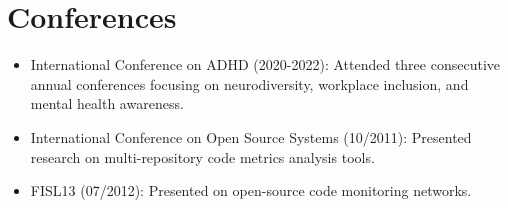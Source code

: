 \section{Conferences}
\begin{itemize}
    \item \footnotesize{International Conference on ADHD (2020-2022):}\scriptsize{ Attended three 
        consecutive annual conferences focusing on neurodiversity, workplace inclusion, and mental 
        health awareness.}
    \item \footnotesize{International Conference on Open Source Systems (10/2011):}\scriptsize{ 
        Presented research on multi-repository code metrics analysis tools.}
    \item \footnotesize{FISL13 (07/2012):}\scriptsize{ Presented on open-source code monitoring 
        networks.}
\end{itemize}